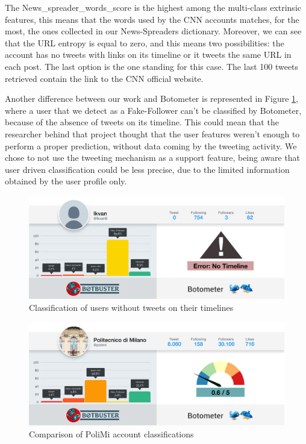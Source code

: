 The News\_spreader\_words\_score is the highest among the multi-class extrinsic features, this means that the words used by the CNN accounts matches, for the most, the ones collected in our News-Spreaders dictionary. Moreover, we can see that the URL entropy is equal to zero, and this means two possibilities: the account has no tweets with links on its timeline or it tweets the same URL in each post. The last option is the one standing for this case. The last 100 tweets retrieved contain the link to the CNN official website.

Another difference between our work and Botometer is represented in Figure \ref{fig:fake}, where a user that we detect as a Fake-Follower can't be classified by Botometer, because of the absence of tweets on its timeline. This could mean that the researcher behind that project thought that the user features weren't enough to perform a proper prediction, without data coming by the tweeting activity.
We chose to not use the tweeting mechanism as a support feature, being aware that user driven classification could be less precise, due to the limited information obtained by the user profile only.
\begin{figure}[htp!]
	\begin{center}
		\includegraphics[width=\columnwidth]{chapter7/figure/fake_follower.png}\par
	\end{center}
	\caption{Classification of users without tweets on their timelines}
	\label{fig:fake}
\end{figure}

\begin{figure}[htp!]
	\begin{center}
		\includegraphics[width=\columnwidth]{chapter7/figure/polimi.png}
	\end{center}
	\caption{Comparison of PoliMi account classifications}
	\label{fig:polimi}
\end{figure}


